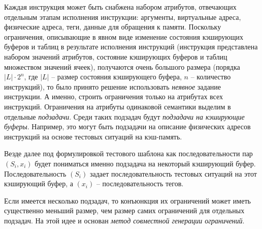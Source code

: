 Каждая инструкция может быть снабжена набором атрибутов, отвечающих
отдельным этапам исполнения инструкции: аргументы, виртуальные
адреса, физические адреса, теги, данные для обращения к памяти.
Поскольку ограничения, описывающие в явном виде изменение состояния
кэширующих буферов и таблиц в результате исполнения инструкций
(инструкция представлена набором значений атрибутов, состояние
кэширующих буферов и таблиц множеством значений ячеек), получаются
очень большого размера (порядка $|L| \cdot 2^n$, где $|L|$ -- размер
состояния кэширующего буфера, $n$ -- количество инструкций), то было
принято решение использовать \emph{неявное} задание инструкции. А
именно, строить ограничения только на атрибутах всех инструкций.
Ограничения на атрибуты одинаковой семантики выделим в отдельные
\emph{подзадачи}. Среди таких подзадач будут \emph{подзадачи на
кэширующие буферы}. Например, это могут быть подзадачи на описание
физических адресов инструкций на основе тестовых ситуаций на
кэш-память.

Везде далее под формулировкой тестового шаблона как
последовательности пар $(S_i, x_i)$ будет пониматься именно
подзадача на некоторый кэширующий буфер. Последовательность $(S_i)$
задает последовательность тестовых ситуаций на этот кэширующий
буфер, а $(x_i)$ -- последовательность тегов.

Если имеется несколько подзадач, то конъюнкция их ограничений может
иметь существенно меньший размер, чем размер самих ограничений для
отдельных подзадач. На этой идее и основан \emph{метод совместной
генерации ограничений}.

